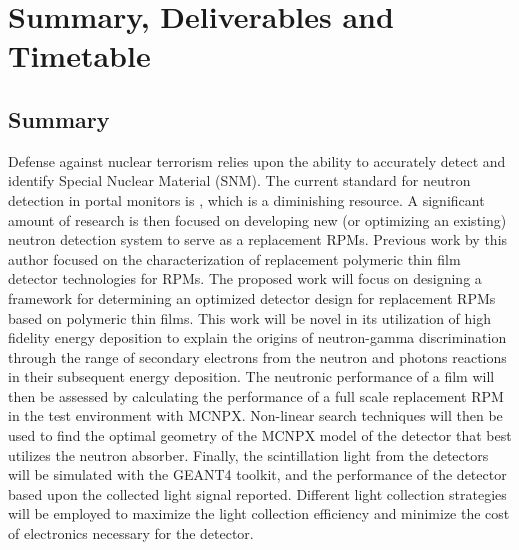 \chapter{Summary, Deliverables and Timetable}
\label{ch:SummaryDeliverables}
\section{Summary}
Defense against nuclear terrorism relies upon the ability to accurately detect and identify Special Nuclear Material (SNM).
The current standard for neutron detection in portal monitors is , which is a diminishing resource. 
A significant amount of research is then focused on developing new (or optimizing an existing) neutron detection system to serve as a replacement RPMs.
Previous work by this author focused on the characterization of replacement polymeric thin film detector technologies for RPMs.  
The proposed work will focus on designing a framework for determining an optimized detector design for replacement RPMs based on polymeric thin films.
This work will be novel in its utilization of high fidelity energy deposition to explain the origins of neutron-gamma discrimination through the range of secondary electrons from the neutron and photons reactions in their subsequent energy deposition.
The neutronic performance of a film will then be assessed by calculating the performance of a full scale replacement RPM in the test environment with MCNPX.
Non-linear search techniques will then be used to find the optimal geometry of the MCNPX model of the detector that best utilizes the neutron absorber.
Finally, the scintillation light from the detectors will be simulated with the GEANT4 toolkit, and the performance of the detector based upon the collected light signal reported.
Different light collection strategies will be employed to maximize the light collection efficiency and minimize the cost of electronics necessary for the detector.


